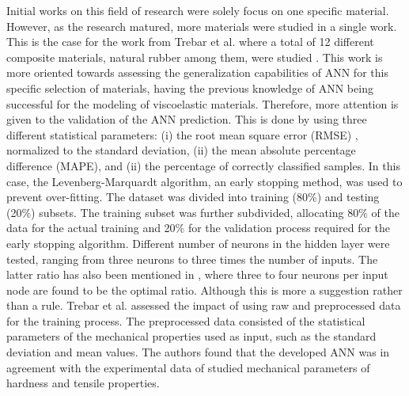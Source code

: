 Initial works on this field of research were solely focus on one specific material. However, as the research matured, more materials were studied in a single work. This is the case for the work from Trebar et al. where a total of 12 different composite materials, natural rubber among them, were studied \cite{trebar2007predicting}. This work is more oriented towards assessing the generalization capabilities of ANN for this specific selection of materials, having the previous knowledge of ANN being successful for the modeling of viscoelastic materials. Therefore, more attention is given to the validation of the ANN prediction. This is done by using three different statistical parameters: (i) the root mean square error (RMSE) , normalized to the standard deviation, (ii) the mean absolute percentage difference (MAPE), and  (ii) the percentage of correctly classified samples. In this case, the Levenberg-Marquardt algorithm, an early stopping method, was used to prevent over-fitting. The dataset was divided into training (80\%) and testing (20\%) subsets. The training subset was further subdivided, allocating 80\% of the data for the actual training and 20\% for the validation process required for the early stopping algorithm. Different number of neurons in the hidden layer were tested, ranging from three neurons to three times the number of inputs. The latter ratio has also been mentioned in \cite{zhang2003artificial}, where three to four neurons per input node are found to be the optimal ratio. Although this is more a suggestion rather than a rule. Trebar et al. assessed the impact of using raw and preprocessed data for the training process. The preprocessed data consisted of the statistical parameters of the mechanical properties used as input, such as the standard deviation and mean values. The authors found that the developed ANN was in agreement with the experimental data of studied mechanical parameters of hardness and tensile properties.


